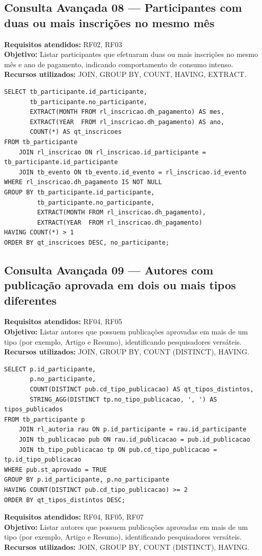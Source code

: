 \documentclass[12pt,a4paper]{article}
\begin{document}
\subsection{Consulta Avançada 08 --- Participantes com duas ou mais inscrições no mesmo mês}
\textbf{Requisitos atendidos:} RF02, RF03 \\
\textbf{Objetivo:} Listar participantes que efetuaram duas ou mais inscrições no mesmo mês e ano de pagamento, indicando comportamento de consumo intenso. \\
\textbf{Recursos utilizados:} JOIN, GROUP BY, COUNT, HAVING, EXTRACT.
\begin{lstlisting}[caption={QA08 --- Participantes com duas ou mais inscrições no mesmo mês.}]
SELECT tb_participante.id_participante,
       tb_participante.no_participante,
       EXTRACT(MONTH FROM rl_inscricao.dh_pagamento) AS mes,
       EXTRACT(YEAR  FROM rl_inscricao.dh_pagamento) AS ano,
       COUNT(*) AS qt_inscricoes
FROM tb_participante
    JOIN rl_inscricao ON rl_inscricao.id_participante = tb_participante.id_participante
    JOIN tb_evento ON tb_evento.id_evento = rl_inscricao.id_evento
WHERE rl_inscricao.dh_pagamento IS NOT NULL
GROUP BY tb_participante.id_participante,
         tb_participante.no_participante,
         EXTRACT(MONTH FROM rl_inscricao.dh_pagamento),
         EXTRACT(YEAR  FROM rl_inscricao.dh_pagamento)
HAVING COUNT(*) > 1
ORDER BY qt_inscricoes DESC, no_participante;
\end{lstlisting}
\subsection{Consulta Avançada 09 --- Autores com publicação aprovada em dois ou mais tipos diferentes}
\textbf{Requisitos atendidos:} RF04, RF05 \\
\textbf{Objetivo:} Listar autores que possuem publicações aprovadas em mais de um tipo (por exemplo, Artigo e Resumo), identificando pesquisadores versáteis. \\
\textbf{Recursos utilizados:} JOIN, GROUP BY, COUNT (DISTINCT), HAVING.
\begin{lstlisting}[caption={QA09 --- Autores com publicação aprovada em dois ou mais tipos diferentes.}]
SELECT p.id_participante,
       p.no_participante,
       COUNT(DISTINCT pub.cd_tipo_publicacao) AS qt_tipos_distintos,
       STRING_AGG(DISTINCT tp.no_tipo_publicacao, ', ') AS tipos_publicados
FROM tb_participante p
    JOIN rl_autoria rau ON p.id_participante = rau.id_participante
    JOIN tb_publicacao pub ON rau.id_publicacao = pub.id_publicacao
    JOIN tb_tipo_publicacao tp ON pub.cd_tipo_publicacao = tp.id_tipo_publicacao
WHERE pub.st_aprovado = TRUE
GROUP BY p.id_participante, p.no_participante
HAVING COUNT(DISTINCT pub.cd_tipo_publicacao) >= 2
ORDER BY qt_tipos_distintos DESC;
\end{lstlisting}
\textbf{Requisitos atendidos:} RF04, RF05, RF07 \\
\textbf{Objetivo:} Listar autores que possuem publicações aprovadas em mais de um tipo (por exemplo, Artigo e Resumo), identificando pesquisadores versáteis. \\
\textbf{Recursos utilizados:} JOIN, GROUP BY, COUNT (DISTINCT), HAVING.
\end{document}
